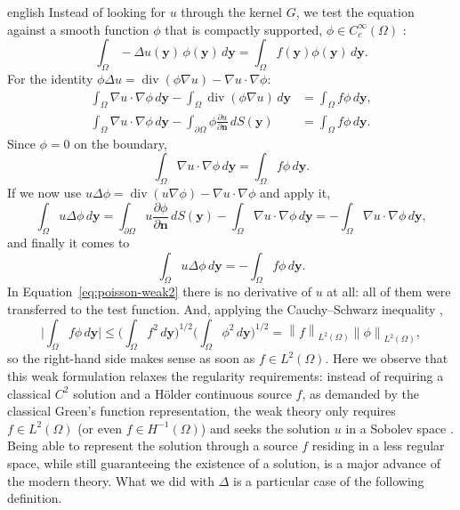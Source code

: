 \documentclass[11pt,letterpaper,twoside,openright]{book} %
\newcommand{\norm}[1]{\left\lVert #1 \right\rVert}
\begin{document}
\begin{hyphenrules}{english}
Instead of looking for $u$ through the kernel $G$, we test the equation against a smooth function
$\phi$ that is compactly supported, $\phi\in C_c^\infty(\Omega)$ \cite{reyna_sobolev}:
\begin{equation}
  \int_\Omega-\Delta u(\mathbf{y})\,\phi(\mathbf{y})\,d\mathbf{y}=\int_\Omega f(\mathbf{y})\phi(\mathbf{y})\,d\mathbf{y}.
  \label{eq:poisson-tested}
\end{equation}
For the identity $\phi\Delta u=\operatorname{div}(\phi\nabla u)-\nabla u\cdot\nabla\phi$:
\begin{align*}
  \int_\Omega\nabla u\cdot\nabla\phi\,d\mathbf{y}-\int_\Omega\operatorname{div}(\phi\nabla u)\,d\mathbf{y}
    &=\int_\Omega f\phi\,d\mathbf{y},\\
  \int_\Omega\nabla u\cdot\nabla\phi\,d\mathbf{y}-\int_{\partial\Omega}\phi\frac{\partial u}{\partial\mathbf{n}}\,d S(\mathbf{y})
    &=\int_\Omega f\phi\,d\mathbf{y}.
\end{align*}
Since $\phi=0$ on the boundary,
\begin{equation}
  \int_\Omega\nabla u\cdot\nabla\phi\,d\mathbf{y}=\int_\Omega f\phi\,d\mathbf{y}.
  \label{eq:poisson-weak1}
\end{equation}
If we now use $u\Delta\phi=\operatorname{div}(u\nabla\phi)-\nabla u\cdot\nabla\phi$ and apply it,
\[
  \int_\Omega u\Delta\phi\,d\mathbf{y}=\int_{\partial\Omega}u\frac{\partial\phi}{\partial\mathbf{n}}\,d S(\mathbf{y})
  -\int_\Omega\nabla u\cdot\nabla\phi\,d\mathbf{y}=-\int_\Omega\nabla u\cdot\nabla\phi\,d\mathbf{y},
\]
and finally it comes to
\begin{equation}
  \int_\Omega u\Delta\phi\,d\mathbf{y}=-\int_\Omega f\phi\,d\mathbf{y}.
  \label{eq:poisson-weak2}
\end{equation}
In Equation~\eqref{eq:poisson-weak2} there is no derivative of $u$ at all: all of them were transferred to the
test function. And, applying the Cauchy--Schwarz inequality \cite{castillo2014},
\begin{equation}
  \Big|\int_\Omega f\phi\,d\mathbf{y}\Big|\le\Big(\int_\Omega f^2\,d\mathbf{y}\Big)^{1/2}\Big(\int_\Omega\phi^2\,d\mathbf{y}\Big)^{1/2}
  =\norm{f}_{L^2(\Omega)}\norm{\phi}_{L^2(\Omega)},
  \label{eq:cauchy-schwarz}
\end{equation}
so the right-hand side makes sense as soon as $f\in L^2(\Omega)$. Here we observe that this weak
formulation relaxes the regularity requirements: instead of requiring a classical $C^2$ solution and a
Hölder continuous source $f$, as demanded by the classical Green's function representation, the weak
theory only requires $f\in L^2(\Omega)$ (or even $f\in H^{-1}(\Omega)$) and seeks the solution $u$ in a
Sobolev space \cite{castillo2014}. Being able to represent the solution through a source $f$
residing in a less regular space, while still guaranteeing the existence of a solution, is a major
advance of the modern theory. What we did with $\Delta$ is a particular case of the following
definition.


\end{hyphenrules}
\end{document}
